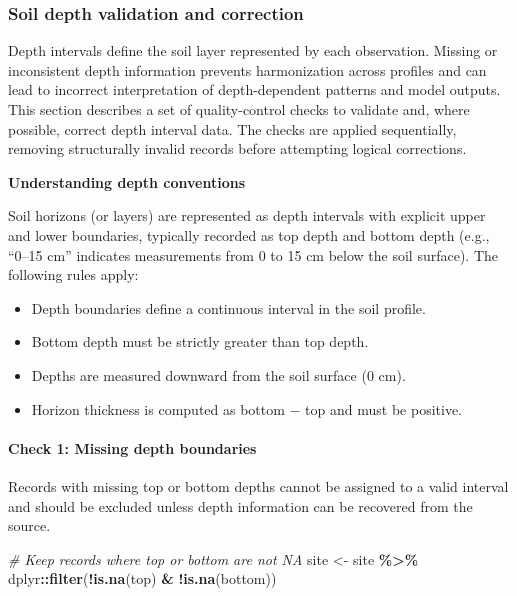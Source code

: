 \documentclass[
  10pt,
  b5paper,
  oneside]{book}
\newenvironment{Shaded}{\begin{snugshade}}{\end{snugshade}}
\newcommand{\CommentTok}[1]{\textcolor[rgb]{0.56,0.35,0.01}{\textit{#1}}}
\newcommand{\FunctionTok}[1]{\textcolor[rgb]{0.13,0.29,0.53}{\textbf{#1}}}
\newcommand{\NormalTok}[1]{#1}
\newcommand{\OtherTok}[1]{\textcolor[rgb]{0.56,0.35,0.01}{#1}}
\newcommand{\SpecialCharTok}[1]{\textcolor[rgb]{0.81,0.36,0.00}{\textbf{#1}}}
\begin{document}
\subsubsection{Soil depth validation and correction}\label{soil-depth-validation-and-correction}

Depth intervals define the soil layer represented by each observation. Missing or inconsistent depth information prevents harmonization across profiles and can lead to incorrect interpretation of depth-dependent patterns and model outputs. This section describes a set of quality-control checks to validate and, where possible, correct depth interval data. The checks are applied sequentially, removing structurally invalid records before attempting logical corrections.

\textbf{Understanding depth conventions}

Soil horizons (or layers) are represented as depth intervals with explicit upper and lower boundaries, typically recorded as top depth and bottom depth (e.g., ``0--15 cm'' indicates measurements from 0 to 15 cm below the soil surface). The following rules apply:

\begin{itemize}
\item
  Depth boundaries define a continuous interval in the soil profile.
\item
  Bottom depth must be strictly greater than top depth.
\item
  Depths are measured downward from the soil surface (0 cm).
\item
  Horizon thickness is computed as bottom − top and must be positive.
\end{itemize}

\paragraph*{Check 1: Missing depth boundaries}\label{check-1-missing-depth-boundaries}

Records with missing top or bottom depths cannot be assigned to a valid interval and should be excluded unless depth information can be recovered from the source.

\begin{Shaded}
\begin{Highlighting}[]
\CommentTok{\# Keep records where \textasciigrave{}top\textasciigrave{} or \textasciigrave{}bottom\textasciigrave{} are not NA}
\NormalTok{site }\OtherTok{\textless{}{-}}\NormalTok{ site }\SpecialCharTok{\%\textgreater{}\%}
\NormalTok{  dplyr}\SpecialCharTok{::}\FunctionTok{filter}\NormalTok{(}\SpecialCharTok{!}\FunctionTok{is.na}\NormalTok{(top) }\SpecialCharTok{\&} \SpecialCharTok{!}\FunctionTok{is.na}\NormalTok{(bottom))}
\end{Highlighting}
\end{Shaded}
\end{document}
